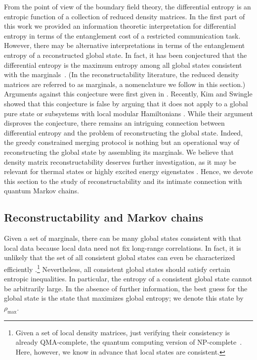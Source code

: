 \documentclass[12pt]{article}
\begin{document}
From the point of view of the boundary field theory, the differential entropy is an entropic function of a collection of reduced density matrices. In the first part of this work we provided an information theoretic interpretation for differential entropy in terms of the entanglement cost of a restricted communication task. However, there may be alternative interpretations in terms of the entanglement entropy of a reconstructed global state. In fact, it has been conjectured that the differential entropy is the maximum entropy among all global states consistent with the marginals~\cite{holeography}. (In the reconstructability literature, the reduced density matrices are referred to as marginals, a nomenclature we follow in this section.) Arguments against this conjecture were first given in \cite{veronikajune}. Recently, Kim and Swingle showed that this conjecture is false by arguing that it does not apply to a global  pure state or subsystems with local modular Hamiltonians \cite{swingle-kim}. While their argument disproves the conjecture, there remains an intriguing connection between differential entropy and the problem of reconstructing the global state. Indeed, the greedy constrained merging protocol is nothing but an operational way of reconstructing the global state by assembling its marginals. We believe that density matrix reconstructability deserves further investigation, as it may be relevant for thermal states or highly excited energy eigenstates \cite{swingle-kim}. Hence, we devote this section to the study of reconstructability and its intimate connection with quantum Markov chains.

\subsection{Reconstructability and Markov chains}

Given a set of marginals, there can be many global states consistent with that local data because local data need not fix long-range correlations.
In fact, it is unlikely that the set of all consistent global states can even be characterized efficiently \cite{poulin2011markov}.\footnote{Given a set of local density matrices, just verifying their consistency is already QMA-complete, the quantum computing version of NP-complete~\cite{liu2006consistency}. Here, however, we know in advance that local states are consistent.
} Nevertheless, all consistent global states should satisfy certain entropic inequalities. In particular, the entropy of a consistent global state cannot be arbitrarily large. In the absence of further information, the best guess for the global state is the state that maximizes global entropy; we denote this state by $\rho_{\max}$.
\end{document}
